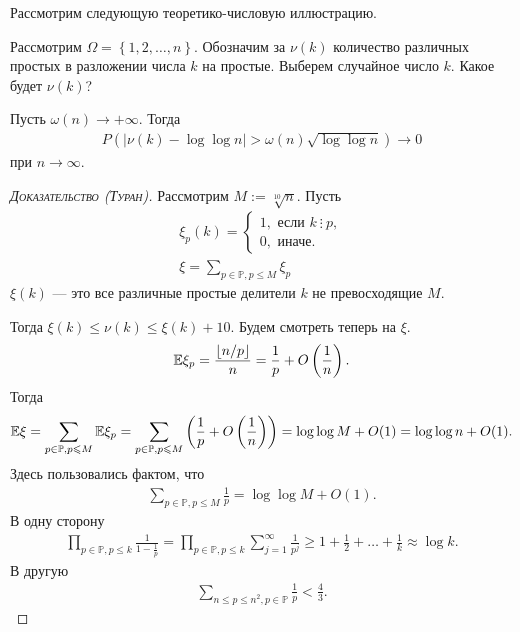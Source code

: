 \documentclass[../main.tex]{subfiles}
\begin{document}
Рассмотрим следующую теоретико-числовую иллюстрацию.

\begin{exmpl}[]
 Рассмотрим $ \Omega = \left\{ 1,2,\ldots,n \right\} $. Обозначим за $ \nu(k) $ количество различных простых в разложении числа $ k $ на простые. Выберем случайное число $ k $. Какое будет $ \nu(k) $?
\end{exmpl}
\begin{thm}
 Пусть $ \omega(n) \to +\infty $. Тогда
 \begin{align*}
  P( \left| \nu(k) - \log\log n \right| > \omega(n) \sqrt{\log\log n}) \to 0
 \end{align*}  при $ n \to \infty $.
\end{thm}
\begin{proof}[\normalfont\textsc{Доказательство (Туран)}]
 Рассмотрим $ M := \sqrt[10] n $. Пусть
 \begin{align*}
  \xi_p(k) = \begin{cases}
   1, \text{ если } k \ \vdots \ p, \\
   0, \text{ иначе. }
  \end{cases} \\
  \xi = \sum_{p \in \mathbb P, p \leqslant M} \xi_p
 \end{align*} $ \xi(k) $ --- это все различные простые делители $ k $ не превосходящие $M$.
 
 Тогда $ \xi(k) \leqslant \nu(k) \leqslant \xi(k) + 10$. Будем смотреть теперь на $ \xi $.
 \begin{align*}
  \mathbb E\xi_p = \frac{\left\lfloor n / p \right\rfloor }{n} = \frac{1}{p} + O\left(\frac{1}{n}\right).
 \end{align*} Тогда
 \begin{align*}
  \mathbb E\xi = \sum_{p \in \mathbb P, p \leqslant M} \mathbb E\xi_p = \sum_{p \in \mathbb P, p \leqslant M}\left(\frac{1}{p} + O \left( \frac{1}{n} \right) \right) = \log\log M + O(1) = \log\log n + O(1).
 \end{align*} Здесь пользовались фактом, что
 \begin{align*}
  \sum_{p \in \mathbb P, p \leqslant M}  \frac{1}{p} = \log \log M + O(1).
 \end{align*}
 В одну сторону
 \begin{align*}
  \prod_{p \in \mathbb P, p \leqslant k} \frac{1}{1 - \frac{1}{p}} = \prod_{p \in \mathbb P, p \leqslant k} \sum_{j=1}^{\infty} \frac{1}{p^{j}} \geqslant 1 + \frac{1}{2} + \ldots + \frac{1}{k} \approx \log k.
 \end{align*} В другую
 \begin{align*}
  \sum_{n \leqslant p \leqslant n^{2}, p \in \mathbb P} \frac{1}{p} < \frac{4}{3}.
 \end{align*} 


\end{proof}
\end{document}
